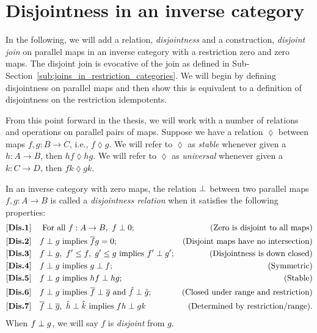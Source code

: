 \section{Disjointness in an inverse category} %
\label{sec:disjointness_in_an_inverse_category}
In the following, we will add a relation, \emph{disjointness} and a construction, \emph{disjoint
  join} on parallel maps in  an inverse category with a restriction
zero and zero maps. The disjoint join is evocative of the join as defined in
Sub-Section~\ref{sub:joins_in_restriction_categories}. We will begin by defining disjointness on
parallel maps and then show this is equivalent to a definition of disjointness on the restriction
idempotents.

From this point forward in the thesis, we will work with a number of relations and operations on
parallel pairs of maps. Suppose we have a relation $\lozenge$ between maps $f,g:B\to C$, i.e., $f
\lozenge g$. We will refer to $\lozenge$ as \emph{stable} whenever given a $h:A \to B$, then $h f
\lozenge h g$. We will refer to $\lozenge$ as \emph{universal} whenever given a $k:C \to D$, then $f
k \lozenge g k$.


\begin{definition}\label{def:disjointness_relation}
  In an inverse category \X with zero maps, the relation $\perp$ between two parallel
  maps $f, g:A \to B$ is called a \emph{disjointness relation} when it satisfies the following
  properties:
  \begin{align*}
    \axiom{Dis}{1}\quad &\text{ For all }f:A\to B,\ f\cdperp 0;&\text{(Zero is disjoint to all maps)}\\
    \axiom{Dis}{2}\quad &f\cdperp g\text{ implies }\rst{f} g = 0; &\text{(Disjoint maps have no intersection)}\\
    \axiom{Dis}{3}\quad &f\cdperp g,\ f' \le f,\ g' \le g\text{ implies }f' \cdperp
    g';&\text{(Disjointness is down closed)}\\
    \axiom{Dis}{4}\quad &f\cdperp g\text{ implies }g \cdperp f; &\text{(Symmetric)}\\
    \axiom{Dis}{5}\quad &f\cdperp g\text{ implies }h f \cdperp h g; &\text{(Stable)}\\
    \axiom{Dis}{6}\quad &f\cdperp g\text{ implies }\rst{f} \cdperp \rst{g}
      \text{ and }\rg{f}\cdperp\rg{g}; &\text{(Closed under range and restriction)}\\
    \axiom{Dis}{7}\quad &\rst{f}\cdperp \rst{g},\ \rg{h}\cdperp \rg{k}\text{ implies }f h
      \cdperp g k &\text{(Determined by restriction/range).}
  \end{align*}
  When $f\perp g$, we will say $f$ is \emph{disjoint} from $g$.
\end{definition}

